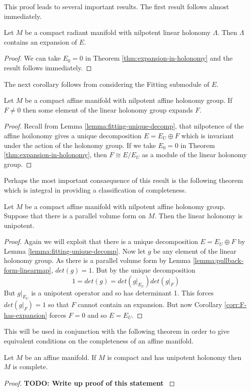 This proof leads to several important results. The first result follows almost
immediately.

\begin{corollary}
    Let $M$ be a compact radiant manifold with nilpotent linear holonomy $\Lambda$. Then $\Lambda$ contains an expansion of $E$.
\end{corollary}
\begin{proof}
    We can take $E_0 = 0$ in Theorem \ref{thm:expansion-in-holonomy} and the result follows immediately.
\end{proof}

The next corollary follows from considering the Fitting submodule of $E$.

\begin{corollary}
    Let $M$ be a compact affine manifold with nilpotent affine holonomy group. If $F \neq 0$ then some element of the linear holonomy group
    expands $F$.
    \label{corr:F-has-expansion}
\end{corollary}
\begin{proof}
    Recall from Lemma \ref{lemma:fitting-unique-decomp}, that nilpotence of the affine hoilonomy gives a unique decomposition
    $E = E_U \oplus F$ which is invariant under the action of the holonomy group. If we take $E_0 = 0$ in Theorem \ref{thm:expansion-in-holonomy},
    then $F \cong E/E_U$ as a module of the linear holonomy group.
\end{proof}

Perhaps the most important consaequence of this result is the following theorem
which is integral in providing a classification of completeness.

\begin{theorem}
    Let $M$ be a compact affine manifold with nilpotent affine holonomy group. Suppose that there is a parallel volume form on $M$.
    Then the linear holonomy is unipotent.
\end{theorem}

\begin{proof}
    Again we will exploit that there is a unique decomposition $E = E_U \oplus F$ by Lemma \ref{lemma:fitting-unique-decomp}. Now let $g$ be
    any element of the linear holonomy group. As there is a parallel volume form by Lemma \ref{lemma:pullback-form-linearmap}, $det(g)=1$. But by the unique decomposition
    \[1 = det(g) = det(g|_{E_U})det(g|_F)\]
    But $g|_{E_U}$ is a unipotent operator and so has determinant 1. This forces
    $det(g|_F)=1$ so that $F$ cannot contain an expansion. But now Corollary
    \ref{corr:F-has-expansion} forces $F=0$ and so $E = E_U$.
\end{proof}

This will be used in conjunction with the following theorem in order to give
equivalent conditions on the completeness of an affine manifold.

\begin{theorem}
    Let $M$ be an affine manifold. If $M$ is compact and has unipotent holonomy then $M$ is complete.
\end{theorem}

\begin{proof}
    \textbf{TODO: Write up proof of this statement} \cite{nilpotent-holonomy}
\end{proof}